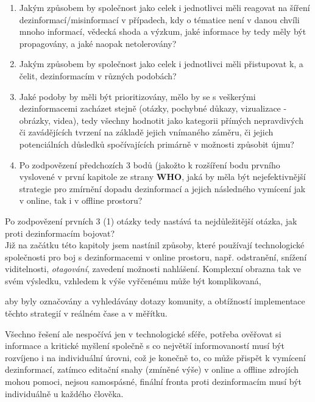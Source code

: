 \begin{enumerate}
\item Jakým způsobem by společnost jako celek i jednotlivci měli reagovat na šíření dezinformací/misinformací v případech, kdy o tématice není v danou chvíli mnoho informací, vědecká shoda a výzkum, jaké informace by tedy měly být propagovány, a jaké naopak netolerovány?
\item Jakým způsobem by společnost jako celek i jednotlivci měli přistupovat k, a čelit, dezinformacím v různých podobách?
\item Jaké podoby by měli být prioritizovány, mělo by se s veškerými dezinformacemi zacházet stejně (otázky, pochybné důkazy, vizualizace - obrázky, videa), tedy všechny hodnotit jako kategorii přímých nepravdivých či zavádějících tvrzení na základě jejich vnímaného záměru, či jejich potenciálních důsledků spočívajících primárně v možnosti způsobit újmu?
\item Po zodpovězení předchozích 3 bodů (jakožto k rozšíření bodu prvního vyslovené v první kapitole ze strany \textbf{WHO}, jaká by měla být nejefektivnější strategie pro zmírnění dopadu dezinformací a jejich následného vymícení jak v online, tak i v offline prostoru? 
\end{enumerate}
\vspace*{5mm}

Po zodpovězení prvních 3 (1) otázky tedy nastává ta nejdůležitější otázka, jak proti dezinformacím bojovat?\\

Již na začátku této kapitoly jsem nastínil způsoby, které používají technologické společnosti pro boj s dezinformacemi v online prostoru,  např. odstranění, snížení viditelnosti, \textit{otagování}, zavedení možnosti nahlášení. Komplexní obrazna tak ve svém výsledku, vzhledem k výše vyřčenému může být komplikovaná, 

aby byly označovány a vyhledávány dotazy komunity, a obtížností implementace těchto strategií v reálném čase a v měřítku.

Všechno řešení ale nespočívá jen v technologické sféře, potřeba ověřovat si informace a kritické myšlení společně s co největší informovaností musí být rozvíjeno i na individuální úrovni, což je konečně to, co může přispět k vymícení dezinformací, zatímco editační snahy (zmíněné výše) v online a offline zdrojích mohou pomoci, nejsou samospásné, finální fronta proti dezinformacím musí být individuálně u každého člověka.\\

